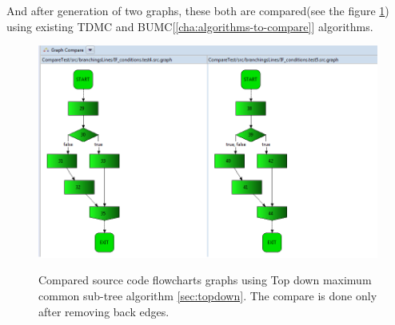 \documentclass{report}
\begin{document}
And after generation of two graphs, these both are compared(see the figure \ref{fig:graphs-compared}) using existing TDMC and BUMC[\ref{cha:algorithms-to-compare}] algorithms.
\begin{figure}
  \centering
  \includegraphics[scale = 0.6]{Figures/Java-flowchart-exp/graphs-compared.png}\\[0.1cm]
  \caption[Compared flowchart graphs using TDMC algorithm ]{Compared source code flowcharts graphs using Top down maximum common sub-tree algorithm \ref{sec:topdown}. The compare is done only after removing back edges.}
  \label{fig:graphs-compared}
\end{figure}
\end{document}
